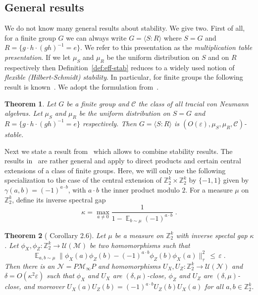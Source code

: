 \documentclass[11pt]{article}
\newtheorem{theorem}{Theorem}[section]
\theoremstyle{definition}
\DeclareMathOperator*{\Expectation}{\mathbb{E}}
\newcommand{\Es}[1]{\Expectation_{#1}}
\newcommand{\Z}{\ensuremath{\mathbb{Z}}}
\newcommand{\mC}{\ensuremath{\mathcal{C}}}
\newcommand{\mM}{\ensuremath{\mathcal{M}}}
\newcommand{\mU}{\ensuremath{\mathcal{U}}}
\newcommand{\eps}{\varepsilon}
\newcommand{\mN}{\mathcal{N}}
\begin{document}
\subsection{General results}

We do not know many general results about stability. We give two. First of all, 
for a finite group $G$ we can always write $G=\langle S:R\rangle$ where $S = G$ and $R=\{ g\cdot h \cdot (gh)^{-1} =e \}$. We refer to this presentation as the \emph{multiplication table presentation}. If we let $\mu_S$ and $\mu_R$ be the uniform distribution on $S$ and on $R$ respectively then Definition~\ref{def:eff-stab} reduces to a widely used notion of \emph{flexible (Hilbert-Schmidt) stability}. In particular, for finite groups the following result is known~\cite{gowers2017inverse,de2019operator}. We adopt the formulation from~\cite[Theorem 1.4]{de2022spectral}.

\begin{theorem}\label{thm:gh}
Let $G$ be a finite group and $\mC$ the class of all tracial von Neumann algebras. Let $\mu_S$ and $\mu_R$ be the uniform distribution on $S=G$ and $R=\{ g\cdot h \cdot (gh)^{-1}=e \}$ respectively. Then $G=\langle S:R\rangle$ is $(O(\eps),\mu_S,\mu_R,\mC)$-stable.
\end{theorem}

Next we state a result from~\cite{de2022spectral} which allows to combine stability results. The results in~\cite{de2022spectral} are rather general and apply to direct products and certain central extensions of a class of finite groups. Here, we will only use the following specialization to the case of the central extension of $\Z_2^k \times \Z_2^k$ by $\{-1,1\}$ given by $\gamma(a,b)=(-1)^{a\cdot b}$, with $a\cdot b$ the inner product modulo $2$. For a measure $\mu$ on $\Z_2^k$, define its inverse spectral gap 
\[ \kappa = \max_{a\neq 0} \frac{1}{1-\Es{b\sim\mu}(-1)^{a\cdot b}}\;.\] 
	

\begin{theorem}[\cite{de2022spectral} Corollary 2.6]\label{thm:dls-gap}
Let $\mu$ be a measure on $\Z_2^k$ with inverse spectal gap $\kappa$. Let $\phi_X,\phi_Z: \Z_2^k \to \mU(\mM)$ be two homomorphisms such that
\[ \Es{a,b\sim \mu} \big\| \phi_X(a)\phi_Z(b)-(-1)^{a\cdot b} \phi_Z(b)\phi_X(a)\big\|_\tau^2 \,\leq\,\eps\;.\]
Then there is an $\mN=P\mM_\infty P$ and homomorphisms $U_X,U_Z:\Z_2^k\to\mU(\mN)$ and $\delta=O(\kappa^2\eps)$ such that $\phi_X$ and $U_X$ are $(\delta,\mu)$-close, $\phi_Z$ and $U_Z$ are $(\delta,\mu)$-close, and moreover $U_X(a)U_Z(b)=(-1)^{a\cdot b}U_Z(b)U_X(a)$ for all $a,b\in\Z_2^k$.
\end{theorem}
\end{document}
